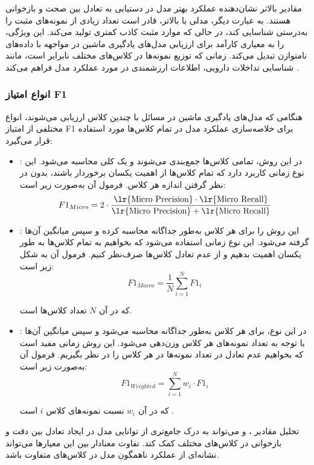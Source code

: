 مقادیر بالاتر  نشان‌دهنده عملکرد بهتر مدل در دستیابی به تعادل بین صحت و بازخوانی هستند. به عبارت دیگر، مدلی با  بالاتر، قادر است تعداد زیادی از نمونه‌های مثبت را به‌درستی شناسایی کند، در حالی که موارد مثبت کاذب کمتری تولید می‌کند. این ویژگی،  را به معیاری کارآمد برای ارزیابی مدل‌های یادگیری ماشین در مواجهه با داده‌های نامتوازن تبدیل می‌کند. زمانی که توزیع نمونه‌ها در کلاس‌های مختلف نابرابر است، مانند شناسایی تداخلات دارویی،  اطلاعات ارزشمندی در مورد عملکرد مدل فراهم می‌کند \cite{ref_sokolova2009}.

\subsubsection{انواع امتیاز F1}

هنگامی که مدل‌های یادگیری ماشین در مسائل با چندین کلاس ارزیابی می‌شوند، انواع مختلفی از امتیاز F1 برای خلاصه‌سازی عملکرد مدل در تمام کلاس‌ها مورد استفاده قرار می‌گیرد:

\begin{itemize}
	\item \textbf{}: در این روش، تمامی کلاس‌ها جمع‌بندی می‌شوند و یک  کلی محاسبه می‌شود. این نوع  زمانی کاربرد دارد که تمام کلاس‌ها از اهمیت یکسان برخوردار باشند، بدون در نظر گرفتن اندازه هر کلاس. فرمول آن به‌صورت زیر است:
	\begin{equation}
		F1_{Micro} = 2 \cdot \frac{\text{\lr{Micro Precision}} \cdot \text{\lr{Micro Recall}}}{\text{\lr{Micro Precision}} + \text{\lr{Micro Recall}}}
	\end{equation}
	
	\item \textbf{}: این روش  را برای هر کلاس به‌طور جداگانه محاسبه کرده و سپس میانگین آن‌ها گرفته می‌شود. این نوع  زمانی استفاده می‌شود که بخواهیم به تمام کلاس‌ها به طور یکسان اهمیت بدهیم و از عدم تعادل کلاس‌ها صرف‌نظر کنیم. فرمول آن به شکل زیر است:
	\begin{equation}
		F1_{Macro} = \frac{1}{N} \sum_{i=1}^{N} F1_i
	\end{equation}	
	
	که در آن \( N \) تعداد کلاس‌ها است.
	
	\item \textbf{}: در این نوع،  برای هر کلاس به‌طور جداگانه محاسبه می‌شود و سپس میانگین آن‌ها با توجه به تعداد نمونه‌های هر کلاس وزن‌دهی می‌شود. این روش زمانی مفید است که بخواهیم عدم تعادل در تعداد نمونه‌ها در هر کلاس را در نظر بگیریم. فرمول آن به‌صورت زیر است:
	\begin{equation}
		F1_{Weighted} = \sum_{i=1}^{N} w_i \cdot F1_i
	\end{equation}
	
	که در آن \( w_i \) نسبت نمونه‌های کلاس \( i \) است \cite{ref_manning2008}.
\end{itemize}
تحلیل مقادیر ،  و  می‌تواند به درک جامع‌تری از توانایی مدل در ایجاد تعادل بین دقت و بازخوانی در کلاس‌های مختلف کمک کند. تفاوت معنادار بین این معیارها می‌تواند نشانه‌ای از عملکرد ناهمگون مدل در کلاس‌های متفاوت باشد.

